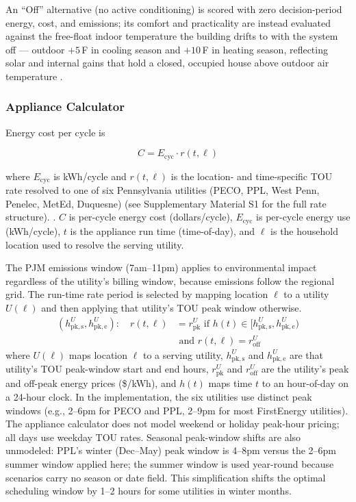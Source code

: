 \documentclass[a4paper,fleqn]{cas-dc}
\begin{document}
An ``Off'' alternative (no active conditioning) is scored with zero decision-period energy, cost, and emissions; its comfort and practicality are instead evaluated against the free-float indoor temperature the building drifts to with the system off --- outdoor $+5$\,\textdegree{}F in cooling season and $+10$\,\textdegree{}F in heating season, reflecting solar and internal gains that hold a closed, occupied house above outdoor air temperature \citep{dedear2002,ashrae55_2020,accamanualj,ashrae_hof2017}.

\subsubsection{Appliance Calculator}
Energy cost per cycle is

\begin{equation}
    C = E_{\mathrm{cyc}} \cdot r(t,\ell)
\end{equation}

where $E_{\mathrm{cyc}}$ is kWh/cycle and $r(t,\ell)$ is the location- and time-specific TOU rate resolved to one of six Pennsylvania utilities (PECO, PPL, West Penn, Penelec, MetEd, Duquesne) \citep{peco2021} (see Supplementary Material S1 for the full rate structure).
\noindent. $C$ is per-cycle energy cost (dollars/cycle), $E_{\mathrm{cyc}}$ is per-cycle energy use (kWh/cycle), $t$ is the appliance run time (time-of-day), and $\ell$ is the household location used to resolve the serving utility.

The PJM emissions window (7am--11pm) applies to environmental impact regardless of the utility's billing window, because emissions follow the regional grid.
The run-time rate period is selected by mapping location $\ell$ to a utility $U(\ell)$ and then applying that utility's TOU peak window otherwise.
\begin{equation}
\begin{split}
(h^{U}_{\mathrm{pk,s}}, h^{U}_{\mathrm{pk,e}}):
\quad
r(t,\ell)&=r^{U}_{\mathrm{pk}}
\text{ if }
h(t)\in[h^{U}_{\mathrm{pk,s}}, h^{U}_{\mathrm{pk,e}}) \\
&\text{ and }
r(t,\ell)=r^{U}_{\mathrm{off}}
\end{split}
\end{equation}
\noindent where $U(\ell)$ maps location $\ell$ to a serving utility, $h^{U}_{\mathrm{pk,s}}$ and $h^{U}_{\mathrm{pk,e}}$ are that utility's TOU peak-window start and end hours, $r^{U}_{\mathrm{pk}}$ and $r^{U}_{\mathrm{off}}$ are the utility's peak and off-peak energy prices (\$/kWh), and $h(t)$ maps time $t$ to an hour-of-day on a 24-hour clock.
\noindent In the implementation, the six utilities use distinct peak windows (e.g., 2--6pm for PECO and PPL, 2--9pm for most FirstEnergy utilities). The appliance calculator does not model weekend or holiday peak-hour pricing; all days use weekday TOU rates. Seasonal peak-window shifts are also unmodeled: PPL's winter (Dec--May) peak window is 4--8pm versus the 2--6pm summer window applied here; the summer window is used year-round because scenarios carry no season or date field. This simplification shifts the optimal scheduling window by 1--2 hours for some utilities in winter months.
\end{document}

